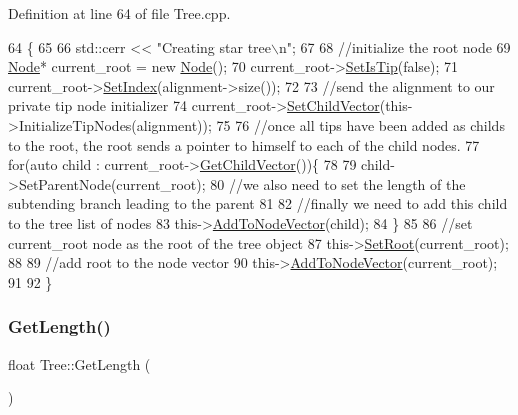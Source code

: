 Definition at line 64 of file Tree.\+cpp.


\begin{DoxyCode}
64                                                         \{
65   
66   std::cerr << \textcolor{stringliteral}{"Creating star tree\(\backslash\)n"};
67   
68   \textcolor{comment}{//initialize the root node}
69   \hyperlink{classNode}{Node}* current\_root = \textcolor{keyword}{new} \hyperlink{classNode}{Node}();
70   current\_root->\hyperlink{classNode_a89bff92e3930d521439395ccf332418f}{SetIsTip}(\textcolor{keyword}{false});
71   current\_root->\hyperlink{classNode_a6f2acc7b954108a6fe266838fce50ef6}{SetIndex}(alignment->size());
72   
73   \textcolor{comment}{//send the alignment to our private tip node initializer}
74   current\_root->\hyperlink{classNode_a7480924f7879b04fe8c787f42ee888fe}{SetChildVector}(this->InitializeTipNodes(alignment));
75 
76   \textcolor{comment}{//once all tips have been added as childs to the root, the root sends a pointer to himself to each of the
       child nodes.}
77   \textcolor{keywordflow}{for}(\textcolor{keyword}{auto} child : current\_root->\hyperlink{classNode_a9b9823315fd95dcd24aac97316de2859}{GetChildVector}())\{
78     
79     child->SetParentNode(current\_root);
80     \textcolor{comment}{//we also need to set the length of the subtending branch leading to the parent}
81     
82     \textcolor{comment}{//finally we need to add this child to the tree list of nodes}
83     this->\hyperlink{classTree_aba172068387b9b5be1a6750a30e8199a}{AddToNodeVector}(child);
84   \}
85 
86   \textcolor{comment}{//set current\_root node as the root of the tree object}
87   this->\hyperlink{classTree_ae592faa2c1f2da3cc1157bd9a4b884b5}{SetRoot}(current\_root);
88   
89   \textcolor{comment}{//add root to the node vector  }
90   this->\hyperlink{classTree_aba172068387b9b5be1a6750a30e8199a}{AddToNodeVector}(current\_root);
91   
92 \}
\end{DoxyCode}
\mbox{\label{classTree_a5812392cfc9ed68d1fc3713d708a5e8f}} 
\subsubsection{\texorpdfstring{Get\+Length()}{GetLength()}}
{\footnotesize\ttfamily float Tree\+::\+Get\+Length (\begin{DoxyParamCaption}{ }\end{DoxyParamCaption})}



